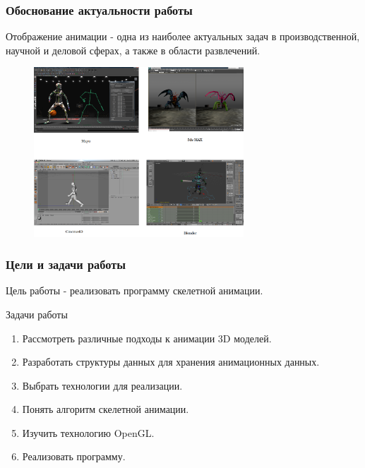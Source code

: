 \documentclass{beamer}
\begin{document}
\begin{frame}
\frametitle{Обоснование актуальности работы}

\scriptsize{Отображение анимации - одна из наиболее актуальных задач  в производственной, научной и деловой сферах, а также в области развлечений.}
\begin{figure}[h!]
    \centering
    \includegraphics[width=0.7\textwidth]{all_tools.png}
\end{figure}

\end{frame}



\begin{frame}
\frametitle{Цели и задачи работы}
    Цель работы - реализовать программу скелетной анимации.
    
    \bigskip
    
    Задачи работы
    
    \smallskip
	\begin{enumerate}
	\item Рассмотреть различные подходы к анимации 3D моделей.
	\item Разработать структуры данных для хранения анимационных данных.
	\item Выбрать технологии для реализации.
	\item Понять алгоритм скелетной анимации.
	\item Изучить технологию OpenGL.
	\item Реализовать программу.
	\end{enumerate}
    
\end{frame}
\end{document}
